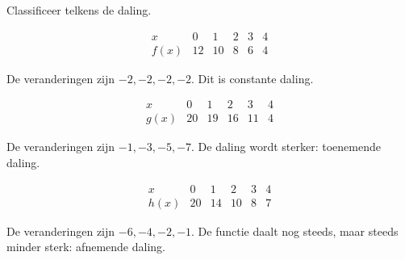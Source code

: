\documentclass{ximera}
\begin{document}
\begin{oefening}{\oefB\ESS}

Classificeer telkens de daling.

\begin{question}
\[
\begin{array}{c|ccccc}
x&0&1&2&3&4\\ \hline
f(x)&12&10&8&6&4
\end{array}
\]

\begin{oplossing}
De veranderingen zijn \(-2,-2,-2,-2\).
Dit is constante daling.
\end{oplossing}
\end{question}

\begin{question}
\[
\begin{array}{c|ccccc}
x&0&1&2&3&4\\ \hline
g(x)&20&19&16&11&4
\end{array}
\]

\begin{oplossing}
De veranderingen zijn \(-1,-3,-5,-7\).
De daling wordt sterker: toenemende daling.
\end{oplossing}
\end{question}

\begin{question}
\[
\begin{array}{c|ccccc}
x&0&1&2&3&4\\ \hline
h(x)&20&14&10&8&7
\end{array}
\]

\begin{oplossing}
De veranderingen zijn \(-6,-4,-2,-1\).
De functie daalt nog steeds, maar steeds minder sterk:
afnemende daling.
\end{oplossing}
\end{question}

\end{oefening}
\end{document}
